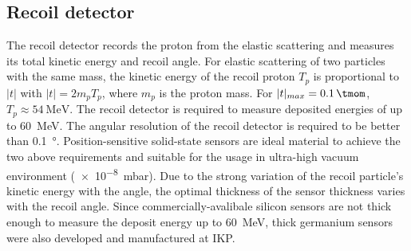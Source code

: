 \documentclass[number,5p]{elsarticle}
\begin{document}
\subsection{Recoil detector}
\label{sec:recoil}

The recoil detector records the proton from the
elastic scattering and measures its total kinetic energy and recoil angle.
For elastic scattering of two particles with the same mass,
the kinetic energy of the recoil proton \(T_p\) is proportional to $|t|$ with \(|t| = 2m_pT_p\), where \(m_p\) is the proton mass.
For $|t|_{max}=\SI{0.1}{\tmom}$, \(T_p \approx \SI{54}{\MeV}\).
The recoil detector is required to measure deposited energies of up to \SI{60}{\MeV}.
The angular resolution of the recoil detector is required to be better than \SI{0.1}{\degree}.
Position-sensitive solid-state sensors are ideal material to achieve the two
above requirements and suitable for the usage in ultra-high vacuum environment (\SI{e-8}{\milli\bar}).
Due to the strong variation of the recoil particle's kinetic energy with the angle,
the optimal thickness of the sensor thickness varies with the recoil angle.
Since commercially-avalibale silicon sensors are not thick enough to measure the deposit energy up to \SI{60}{\MeV},
thick germanium sensors were also developed and manufactured at IKP.
\end{document}
